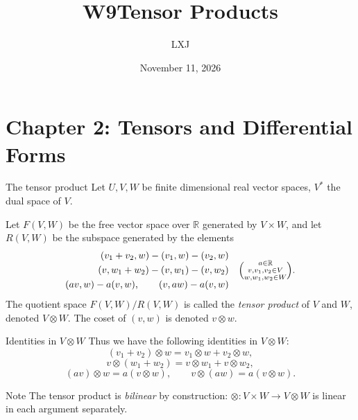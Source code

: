 \documentclass[10pt]{beamer}
\title{W9\quad Tensor Products}
\date{November 11, 2026}
\author{LXJ}
\newcommand{\R}{\mathbb{R}}
\begin{document}
\maketitle

\section{Chapter 2: Tensors and Differential Forms}

\begin{frame}{The tensor product}
	Let $U, V, W$ be finite dimensional real vector spaces, $V^*$ the
	dual space of $V$.
	\medskip

	\begin{definition}
		Let $F(V, W)$ be the free vector space over $\R$ generated by
		$V \times W$, and let $R(V, W)$ be the subspace generated by
		the elements
		\[
			\begin{aligned}
				(v_1 + v_2, w) - (v_1, w) - (v_2, w) \\
				(v, w_1 + w_2) - (v, w_1) - (v, w_2) \\
				(av, w) - a(v, w), \qquad (v, aw) - a(v, w)
			\end{aligned}
			\quad
			\Bigl( \substack{a \in \R \\[1pt] v, v_1, v_2 \in V \\
				w, w_1, w_2 \in W} \Bigr).
		\]
		The quotient space $F(V, W) / R(V, W)$ is called the
		\emph{tensor product} of $V$ and $W$, denoted $V \otimes W$.
		The coset of $(v, w)$ is denoted $v \otimes w$.
	\end{definition}
\end{frame}

\begin{frame}{Identities in $V \otimes W$}
	Thus we have the following identities in $V \otimes W$:
	\[
		(v_1 + v_2) \otimes w = v_1 \otimes w + v_2 \otimes w,
	\]
	\[
		v \otimes (w_1 + w_2) = v \otimes w_1 + v \otimes w_2,
	\]
	\[
		(av) \otimes w = a(v \otimes w),
		\qquad
		v \otimes (aw) = a(v \otimes w).
	\]
	\medskip
	\begin{block}{Note}
		The tensor product is \emph{bilinear} by construction:
		$\otimes : V \times W \to V \otimes W$ is linear in each
		argument separately.
	\end{block}
\end{frame}
\end{document}
